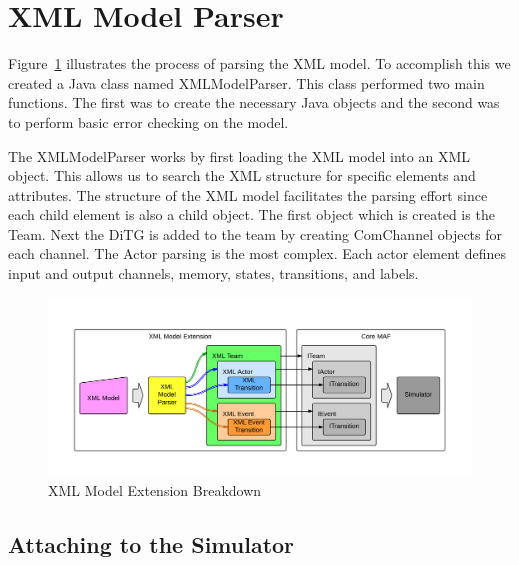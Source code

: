\section{XML Model Parser}

Figure~\ref{fig:xml_model_extension} illustrates the process of parsing the XML model.  To accomplish this we created a Java class named XMLModelParser.  This class performed two main functions.  The first was to create the necessary Java objects and the second was to perform basic error checking on the model.  

The XMLModelParser works by first loading the XML model into an XML object.  This allows us to search the XML structure for specific elements and attributes.  The structure of the XML model facilitates the parsing effort since each child element is also a child object.  The first object which is created is the Team.  Next the DiTG is added to the team by creating ComChannel objects for each channel.  The Actor parsing is the most complex.  Each actor element defines input and output channels, memory, states, transitions, and labels.

\begin{figure}[h]
\begin{center}
\includegraphics[width=6in]{xml_model_extension.png}
\caption{XML Model Extension Breakdown}
\label{fig:xml_model_extension}
\end{center}
\end{figure}

\subsection{Attaching to the Simulator}

